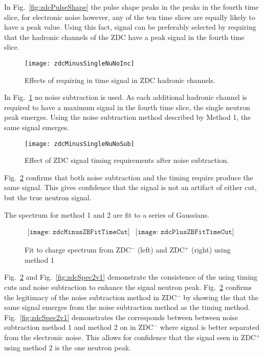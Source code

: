        In Fig.~\ref{fig:zdcPulseShape} the pulse shape peaks in the peaks in the
        fourth time slice, for electronic noise however, any of the ten time 
        slices are equally likely to have a peak value.
      Using this fact, signal can be preferably selected by requiring that the
        hadronic channels of the ZDC have a peak signal in the fourth time 
        slice.
      \begin{figure}[h]
        \centering
        \texttt{[image: zdcMinusSingleNuNoInc]}
        \caption{Effects of requiring in time signal in ZDC hadronic 
          channels.}
        \label{fig:zdcTimingCuts}
      \end{figure}
      In Fig.~\ref{fig:zdcTimingCuts} no noise subtraction is used. 
      As each additional hadronic channel is required to have a maximum signal
        in the fourth time slice, the single neutron peak emerges. 
      Using the noise subtraction method described by Method 1, the same signal
        emerges.
       \begin{figure}[h]
        \centering
        \texttt{[image: zdcMinusSingleNuNoSub]}
        \caption{Effect of ZDC signal timing requirements after noise 
          subtraction.}
        \label{fig:zdcTimingAfterNoiseSub}
      \end{figure}
      Fig.~\ref{fig:zdcTimingAfterNoiseSub} confirms that both noise 
        subtraction and the timing require produce the same signal.
      This gives confidence that the signal is not an artifact of either cut, 
        but the true neutron signal.

      The spectrum for method 1 and 2 are fit to a series of Gaussians.
      \begin{figure}[!Hhtb]
        \centering
        $ \begin{array}{cc}
          \texttt{[image: zdcMinusZBFitTimeCut]} &
          \texttt{[image: zdcPlusZBFitTimeCut]}
        \end{array} $
        \caption{Fit to charge spectrum from ZDC$^{-}$ (left) and ZDC$^{+}$ (right) using 
          method 1}
        \label{fig:zdcM1Fit}
      \end{figure}

       Fig.~\ref{fig:zdcTimingAfterNoiseSub} and Fig.~\ref{fig:zdcSpec2v1} 
        demonstrate the consistence of the using timing cuts and noise 
        subtraction to enhance the signal neutron peak. 
      Fig.~\ref{fig:zdcTimingAfterNoiseSub} confirms the legitimacy of the 
        noise subtraction method in ZDC$^{-}$ by showing the that the same signal
        emerges from the noise subtraction method as the timing method.
      Fig.~\ref{fig:zdcSpec2v1} demonstrates the corresponds between between
        noise subtraction method 1 and method 2 on in ZDC$^{-}$ where signal is 
        better separated from the electronic noise. 
      This allows for confidence that the signal seen in ZDC$^{+}$ using method 2 
        is the one neutron peak.
 
